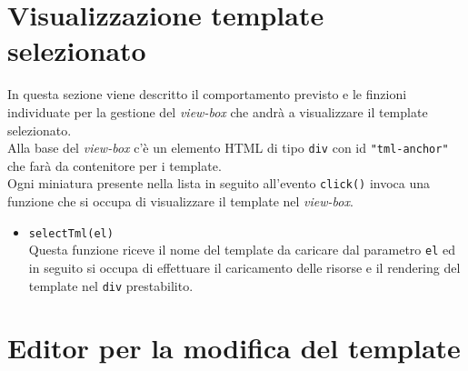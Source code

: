 \section{Visualizzazione template selezionato}
In questa sezione viene descritto il comportamento previsto e le finzioni individuate per la gestione del \textit{view-box} che andrà a visualizzare il template selezionato.\\
Alla base del \textit{view-box} c'è un elemento HTML di tipo \texttt{div} con id \texttt{"tml-anchor"} che farà da contenitore per i template.\\
Ogni miniatura presente nella lista in seguito all'evento \texttt{click()} invoca una funzione che si occupa di visualizzare il template nel \textit{view-box}.
\begin{itemize}
	\item \texttt{selectTml(el)}\\
	Questa funzione riceve il nome del template da caricare dal parametro \texttt{el} ed in seguito si occupa di effettuare il caricamento delle risorse e il rendering del template nel \texttt{div} prestabilito.
\end{itemize}
\section{Editor per la modifica del template}